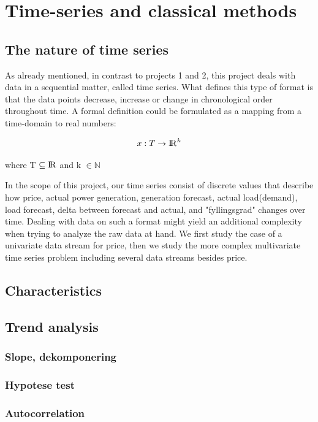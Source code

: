 \documentclass
[twocolumn,
secnumarabic,
nobibnotes,
aps,
prl,
reprint,
groupedaddress,
amsmath,
amssymb,
]{revtex4-2}
\begin{document}
\section{Time-series and classical methods}

\subsection{The nature of time series}
As already mentioned, in contrast to projects 1 and 2, this project deals with data in a sequential matter, called time series. What defines this type of format is that the data points decrease, increase or change in chronological order throughout time\cite{Vishwas2020}.  A formal definition could be formulated as a mapping from a time-domain to real numbers:

\begin{equation}
  x: T \rightarrow  {\rm I\!R}^k 
\end{equation}

where T $\subseteq {\rm I\!R}$ and k $\in \mathbb{N}$ \cite{Auffarth2021}

In the scope of this project, our time series consist of discrete values that describe how price, actual power generation, generation forecast, actual load(demand), load forecast, delta between forecast and actual, and "fyllingsgrad" changes over time. 
Dealing with data on such a format might yield an additional complexity when trying to analyze the raw data at hand. We first study the case of a univariate data stream for price, then we study the more complex multivariate time series problem including several data streams besides price. 


\subsection{Characteristics}

\subsection{Trend analysis}


\subsubsection{Slope, dekomponering}
\subsubsection{Hypotese test}
\subsubsection{Autocorrelation}
\end{document}
